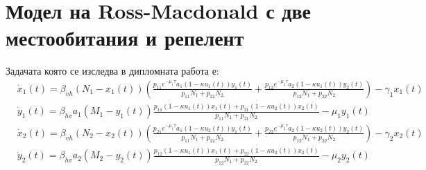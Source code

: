 \section{Модел на Ross-Macdonald с две местообитания и репелент}
Задачата която се изследва в дипломната работа е:
\begin{equation}
  \label{eq:TheProblem}
  \begin{split}
    &\dot{x}_1(t) = \beta_{vh} (N_1-x_1(t)) \left(\frac{p_{11} e^{-\mu_1 \tau} a_1 (1-\kappa u_1(t)) y_1(t)}{p_{11} N_1 + p_{21} N_2} + \frac{p_{12} e^{-\mu_2 \tau} a_2 (1-\kappa u_1(t)) y_2(t)}{p_{12} N_1 + p_{22} N_2}\right) - \gamma_1 x_1(t) \\
    &\dot{y}_1(t) = \beta_{hv} a_1 (M_1-y_1(t)) \frac{p_{11} (1-\kappa u_1(t)) x_1(t) + p_{21} (1-\kappa u_2(t)) x_2(t)}{p_{11} N_1 + p_{21} N_2} - \mu_1 y_1(t) \\
    &\dot{x}_2(t) = \beta_{vh} (N_2-x_2(t)) \left(\frac{p_{21} e^{-\mu_1 \tau} a_1 (1-\kappa u_2(t)) y_1(t)}{p_{11} N_1 + p_{21} N_2} + \frac{p_{22} e^{-\mu_2 \tau} a_2 (1-\kappa u_2(t)) y_2(t)}{p_{12} N_1 + p_{22} N_2}\right) - \gamma_2 x_2(t) \\
    &\dot{y}_2(t) = \beta_{hv} a_2 (M_2-y_2(t)) \frac{p_{12} (1-\kappa u_1(t)) x_1(t) + p_{22} (1-\kappa u_2(t)) x_2(t)}{p_{12} N_1 + p_{22} N_2} - \mu_2 y_2(t)
  \end{split}
  \end{equation}

